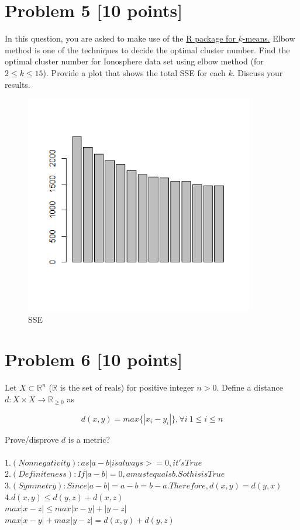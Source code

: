 \documentclass{article}
\begin{document}

 
 \section*{Problem 5 [10 points]} In this question, you are asked to make use of  the \href{https://stat.ethz.ch/R-manual/R-devel/library/stats/html/kmeans.html}{ R package for $k$-means.} Elbow method is one of the techniques to decide the optimal cluster number.  Find the optimal cluster number for Ionosphere data set using elbow method (for  $2 \leq k \leq 15$). Provide a plot that shows the total SSE for each $k$. Discuss your results.
\begin{figure}
  \includegraphics[width=100mm, scale = 0.5]{SSE.png}
  \caption{SSE}
\end{figure}
 
\section*{Problem 6 [10 points]}

Let $X \subset \mathbb{R}^n$  ($\mathbb{R}$ is the set of reals) for positive integer  $n>0$. Define a  distance $d: X \times X \rightarrow  \mathbb{R}_{\geq 0} $ as

\begin{equation*}
d(x,y) =  max\{|x_i - y_i|\}, \forall i\ 1\leq i \leq n
\end{equation*}

Prove/disprove $d$ is a metric?
\paragraph{}
$1. (Non negativity) : as |a-b| is always >= 0, it's True$\\
$2. (Definiteness): If |a-b| = 0, a must equals b. So this is True$\\
$3. (Symmetry): Since |a-b| = a - b = b - a. Therefore, d(x,y) = d(y,x)$\\
$4. d(x,y) \leq d(y,z) + d(x,z)$\\
$max{|x - z|} \leq max{|x-y| + |y - z|}$\\
$max{|x-y|} + max{|y-z|} = d(x,y) + d(y,z)$
\end{document}
